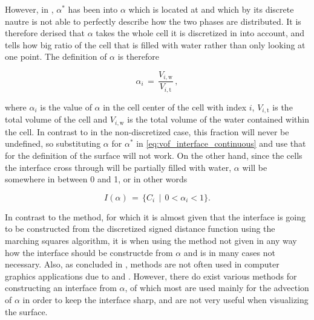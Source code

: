 However, in \thisprojectwork, $\alpha^*$ has been \discretized into $\alpha$ which is located at  and which by its discrete nautre is not able to perfectly describe how the two phases are distributed. It is therefore derised that $\alpha$ takes the whole cell it is discretized in into account, and tells how big ratio of the cell that is filled with water rather than only looking at one point. The definition of $\alpha$ is therefore

\begin{equation} \label{eq:phase_fraction_discretized}
\alpha_i \,=\, \frac{V_{i,\text{w}}}{V_{i,\text{t}}}\,,
\end{equation}

where $\alpha_i$ is the value of $\alpha$ in the cell center of the cell with index $i$, $V_{i,\text{t}}$ is the total volume of the cell and $V_{i,\text{w}}$ is the total volume of the water contained within the cell. In contrast to in the non-discretized case, this fraction will never be undefined, so substituting $\alpha$ for $\alpha^*$ in \eqref{eq:vof_interface_continuous} and use that for the definition of the surface will not work. On the other hand, since the cells the interface cross through will be partially filled with water, $\alpha$ will be somewhere in between 0 and 1, or in other words

\begin{equation} \label{eq:vof_interface_discrete}
I(\alpha) \,=\, \{C_i \,\mid\, 0 < \alpha_i < 1\}.
\end{equation}


In contrast to the \LS method, for which it is almost given that the interface is going to be constructed from the discretized signed distance function using the marching squares algorithm, it is when using the \VOF method not given in any way how the interface should be constructde from $\alpha$ and is in many cases not necessary. Also, as concluded in \citep{Wojtan2009}, \VOF methods are not often used in computer graphics applications due to  and . However, there do exist various methods for constructing an interface from $\alpha$, of which most are used mainly for the advection of $\alpha$ in order to keep the interface sharp, and are not very useful when visualizing the surface.



